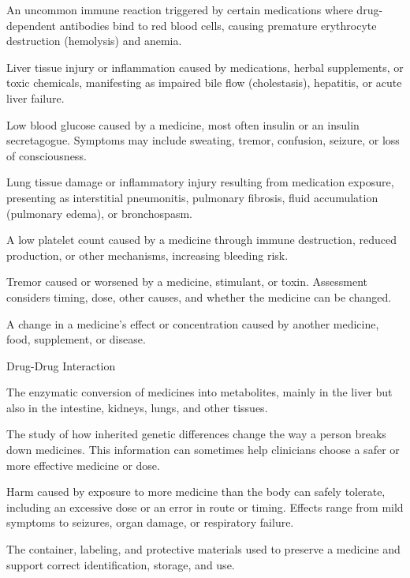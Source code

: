  An uncommon immune reaction triggered by certain medications where drug-dependent antibodies bind to red blood cells, causing premature erythrocyte destruction (hemolysis) and anemia.

 Liver tissue injury or inflammation caused by medications, herbal supplements, or toxic chemicals, manifesting as impaired bile flow (cholestasis), hepatitis, or acute liver failure.

 Low blood glucose caused by a medicine, most often insulin or an insulin secretagogue. Symptoms may include sweating, tremor, confusion, seizure, or loss of consciousness.

 Lung tissue damage or inflammatory injury resulting from medication exposure, presenting as interstitial pneumonitis, pulmonary fibrosis, fluid accumulation (pulmonary edema), or bronchospasm.

 A low platelet count caused by a medicine through immune destruction, reduced production, or other mechanisms, increasing bleeding risk.

 Tremor caused or worsened by a medicine, stimulant, or toxin. Assessment considers timing, dose, other causes, and whether the medicine can be changed.

 A change in a medicine’s effect or concentration caused by another medicine, food, supplement, or disease.

\synonyms
Drug-Drug Interaction

 The enzymatic conversion of medicines into metabolites, mainly in the liver but also in the intestine, kidneys, lungs, and other tissues.

 The study of how inherited genetic differences change the way a person breaks down medicines. This information can sometimes help clinicians choose a safer or more effective medicine or dose.

 Harm caused by exposure to more medicine than the body can safely tolerate, including an excessive dose or an error in route or timing. Effects range from mild symptoms to seizures, organ damage, or respiratory failure.

 The container, labeling, and protective materials used to preserve a medicine and support correct identification, storage, and use.

